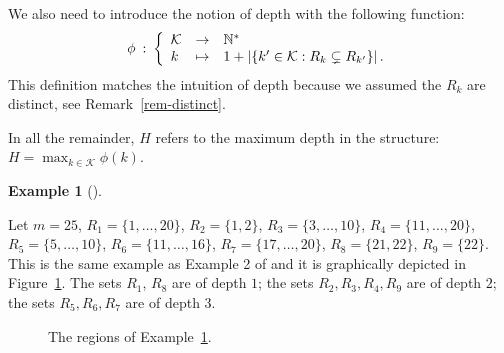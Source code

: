 \documentclass[
  11pt,
  a4paper,
]{article}
\theoremstyle{definition}
\newtheorem{example}{Example}[section]
\theoremstyle{plain}
\theoremstyle{plain}
\theoremstyle{plain}
\theoremstyle{definition}
\theoremstyle{remark}
\begin{document}
We also need to introduce the notion of depth with the following
function: \begin{equation}
\phi \:  : \: \left\{
\begin{array}{l  c l  }
 \mathcal{K}& \to & \mathbb{N}^*\\
k & \mapsto & 1 + \left| \{k'\in\mathcal{K}: R_k\subsetneq R_{k'} \} \right|   .
\end{array}
\right.
\label{eq-depth}
\end{equation} This definition matches the intuition of depth because we
assumed the \(R_k\) are distinct, see Remark~\ref{rem-distinct}.

In all the remainder, \(H\) refers to the maximum depth in the
structure: \(H=\max_{k\in\mathcal{K}}\phi(k)\).

\begin{example}[]\protect\hypertarget{exm-toy-forest}{}\label{exm-toy-forest}

Let \(m=25\), \(R_1 = \{1, \dotsc , 20 \}\), \(R_2  =  \{1, 2  \}\),
\(R_3   =   \{3 , \dotsc , 10 \}\), \(R_4  =    \{11, \dotsc , 20 \}\),
\(R_5 =  \{5, \dotsc , 10 \}\), \(R_6   =     \{11, \dotsc , 16 \}\),
\(R_7  =   \{17, \dotsc ,20  \}\), \(R_8=\{21,22\}\), \(R_9 = \{22\}\).
This is the same example as Example 2 of \citet{MR4178188} and it is
graphically depicted in Figure~\ref{fig-forest-exm}. The sets \(R_1\),
\(R_8\) are of depth \(1\); the sets \(R_2,R_3,R_4,R_9\) are of depth
\(2\); the sets \(R_5,R_6,R_7\) are of depth \(3\).

\end{example}

\begin{figure}


\caption{\label{fig-forest-exm}The regions of
Example~\ref{exm-toy-forest}.}

\end{figure}%
\end{document}
